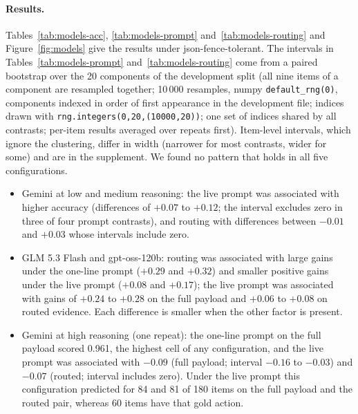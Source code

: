 \paragraph{Results.} Tables~\ref{tab:models-acc}, \ref{tab:models-prompt} and~\ref{tab:models-routing} and Figure~\ref{fig:models} give the results under json-fence-tolerant. The intervals in Tables~\ref{tab:models-prompt} and~\ref{tab:models-routing} come from a paired bootstrap over the 20 components of the development split (all nine items of a component are resampled together; 10\,000 resamples, numpy \texttt{default\_rng(0)}, components indexed in order of first appearance in the development file; indices drawn with \texttt{rng.integers(0,20,(10000,20))}; one set of indices shared by all contrasts; per-item results averaged over repeats first). Item-level intervals, which ignore the clustering, differ in width (narrower for most contrasts, wider for some) and are in the supplement. We found no pattern that holds in all five configurations.
\begin{itemize}[nosep]
\item Gemini at low and medium reasoning: the live prompt was associated with higher accuracy (differences of $+0.07$ to $+0.12$; the interval excludes zero in three of four prompt contrasts), and routing with differences between $-0.01$ and $+0.03$ whose intervals include zero.
\item GLM 5.3 Flash and gpt-oss-120b: routing was associated with large gains under the one-line prompt ($+0.29$ and $+0.32$) and smaller positive gains under the live prompt ($+0.08$ and $+0.17$); the live prompt was associated with gains of $+0.24$ to $+0.28$ on the full payload and $+0.06$ to $+0.08$ on routed evidence. Each difference is smaller when the other factor is present.
\item Gemini at high reasoning (one repeat): the one-line prompt on the full payload scored 0.961, the highest cell of any configuration, and the live prompt was associated with $-0.09$ (full payload; interval $-0.16$ to $-0.03$) and $-0.07$ (routed; interval includes zero). Under the live prompt this configuration predicted \abstain{} for 84 and 81 of 180 items on the full payload and the routed pair, whereas 60 items have that gold action.
\end{itemize}

